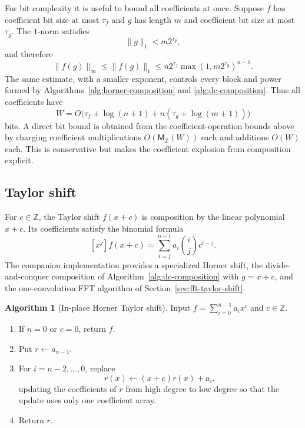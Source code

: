 \documentclass[11pt]{book}
\theoremstyle{definition}
\newtheorem{algorithm}[theorem]{Algorithm}
\newcommand{\ZZ}{\mathbb Z}
\newcommand{\MZ}{\mathsf M_{\ZZ}}
\begin{document}
For bit complexity it is useful to bound all coefficients at once.  Suppose
$f$ has coefficient bit size at most $\tau_f$ and $g$ has length $m$ and
coefficient bit size at most $\tau_g$.  The $1$-norm satisfies
\[
 \|g\|_1<m2^{\tau_g},
\]
and therefore
\begin{equation}\label{eq:composition-height}
 \|f(g)\|_\infty
 \le \|f(g)\|_1
 \le n2^{\tau_f}\max(1,m2^{\tau_g})^{n-1}.
\end{equation}
The same estimate, with a smaller exponent, controls every block and power
formed by Algorithms~\ref{alg:horner-composition} and
\ref{alg:dc-composition}.  Thus all coefficients have
\begin{equation}\label{eq:composition-bits}
 W=O\bigl(\tau_f+\log(n+1)+n(\tau_g+\log(m+1))\bigr)
\end{equation}
bits.  A direct bit bound is obtained from the coefficient-operation bounds
above by charging coefficient multiplications $O(\MZ(W))$ each and additions
$O(W)$ each.  This is conservative but makes the coefficient explosion from
composition explicit.

\subsection{Taylor shift}

For $c\in\ZZ$, the Taylor shift $f(x+c)$ is composition by the linear
polynomial $x+c$.  Its coefficients satisfy the binomial formula
\begin{equation}\label{eq:taylor-binomial}
 [x^j]f(x+c)=\sum_{i=j}^{n-1}a_i\binom{i}{j}c^{i-j}.
\end{equation}
The companion implementation provides a specialized Horner shift, the
divide-and-conquer composition of Algorithm~\ref{alg:dc-composition} with
$g=x+c$, and the one-convolution FFT algorithm of
Section~\ref{sec:fft-taylor-shift}.

\begin{algorithm}[In-place Horner Taylor shift]\label{alg:horner-taylor}
Input $f=\sum_{i=0}^{n-1}a_ix^i$ and $c\in\ZZ$.
\begin{enumerate}
 \item If $n=0$ or $c=0$, return $f$.
 \item Put $r\leftarrow a_{n-1}$.
 \item For $i=n-2,\ldots,0$, replace
 \[
    r(x)\leftarrow (x+c)r(x)+a_i,
 \]
 updating the coefficients of $r$ from high degree to low degree so that the
 update uses only one coefficient array.
 \item Return $r$.
\end{enumerate}
\end{algorithm}
\end{document}
